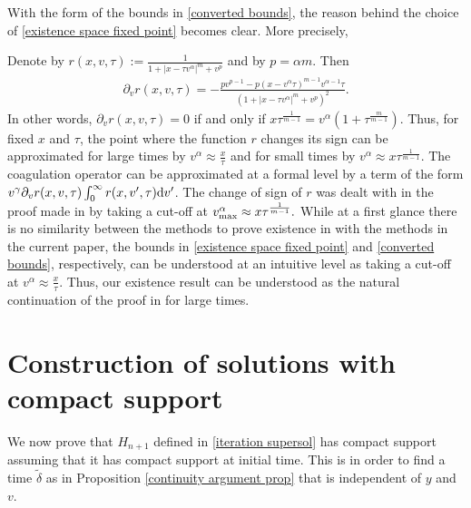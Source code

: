 \documentclass[11pt]{article}
\numberwithin{equation}{section}
\newcommand{\der}{\textup{d}}
\begin{document}
With the form of the bounds in \eqref{converted bounds}, the reason behind the choice of \eqref{existence space fixed point} becomes clear. More precisely,
\begin{rmk}
Denote by $r(x,v,\tau):=\frac{1}{1+|x-\tau v^{\alpha}|^{m}+v^{p}}$ and by $p=\alpha m$. Then
\begin{align*}
\partial_{v}r(x,v,\tau)=-\frac{pv^{p-1}-p(x-v^{\alpha}\tau)^{m-1}v^{\alpha-1}\tau}{(1+|x-\tau v^{\alpha}|^{m}+v^{p})^{2}}.
\end{align*}
In other words, $\partial_{v}r(x,v,\tau)=0$ if and only if $x \tau^{\frac{1}{m-1}}=v^{\alpha}(1+\tau^{\frac{m}{m-1}})$. Thus, for fixed $x$ and $\tau$, the point where the function $r$ changes its sign can be approximated for large times by $v^{\alpha}\approx \frac{x}{\tau}$ and for small times by $v^{\alpha}\approx x \tau^{\frac{1}{m-1}}$. The coagulation operator can be approximated at a formal level by a term of the form $v^{\gamma}\partial_{v}r(x,v,\tau)\int_{0}^{\infty}r(x,v',\tau)\der v'$. The change of sign of $r$ was dealt with in the proof made in \cite{cristianinhom} by taking a cut-off at $v^{\alpha}_{\textup{max}}\approx x\tau ^{\frac{1}{m-1}}.$ While at a first glance there is no similarity between the methods to prove existence in \cite{cristianinhom} with the methods in the current paper, the bounds in \eqref{existence space fixed point} and \eqref{converted bounds}, respectively, can be understood at an intuitive level as taking a cut-off at $v^{\alpha}\approx \frac{x}{\tau}$. Thus, our existence result can be understood as the natural continuation of the proof in \cite{cristianinhom} for large times.
\end{rmk}
\section{Construction of solutions with compact support}\label{appendix a}
We now prove that $H_{n+1}$ defined in \eqref{iteration supersol} has compact support assuming that it has compact support at initial time. This is in order to find a time $\tilde{\delta}$ as in Proposition \ref{continuity argument prop} that is independent of $y$ and $v$.
\end{document}
